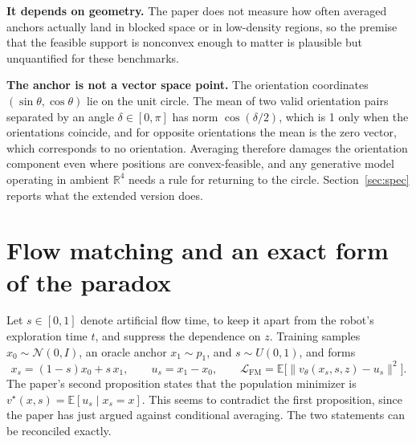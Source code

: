 \documentclass[11pt]{article}
\theoremstyle{plain}
\theoremstyle{remark}
\newcommand{\E}{\mathbb E}
\newcommand{\R}{\mathbb R}
\begin{document}
\textbf{It depends on geometry.} The paper does not measure how often averaged anchors actually land in blocked space or in low-density regions, so the premise that the feasible support is nonconvex enough to matter is plausible but unquantified for these benchmarks.

\textbf{The anchor is not a vector space point.} The orientation coordinates $(\sin\theta,\cos\theta)$ lie on the unit circle. The mean of two valid orientation pairs separated by an angle $\delta\in[0,\pi]$ has norm $\cos(\delta/2)$, which is 1 only when the orientations coincide, and for opposite orientations the mean is the zero vector, which corresponds to no orientation. Averaging therefore damages the orientation component even where positions are convex-feasible, and any generative model operating in ambient $\R^4$ needs a rule for returning to the circle. Section~\ref{sec:spec} reports what the extended version does.

\section{Flow matching and an exact form of the paradox}\label{sec:fm}

Let $s\in[0,1]$ denote artificial flow time, to keep it apart from the robot's exploration time $t$, and suppress the dependence on $z$. Training samples $x_0\sim\mathcal N(0,I)$, an oracle anchor $x_1\sim p_1$, and $s\sim U(0,1)$, and forms
\[
x_s=(1-s)x_0+s\,x_1,\qquad u_s=x_1-x_0,\qquad \mathcal L_{\mathrm{FM}}=\E\big[\|v_\theta(x_s,s,z)-u_s\|^2\big].
\]
The paper's second proposition states that the population minimizer is $v^\star(x,s)=\E[u_s\mid x_s=x]$. This seems to contradict the first proposition, since the paper has just argued against conditional averaging. The two statements can be reconciled exactly.
\end{document}
